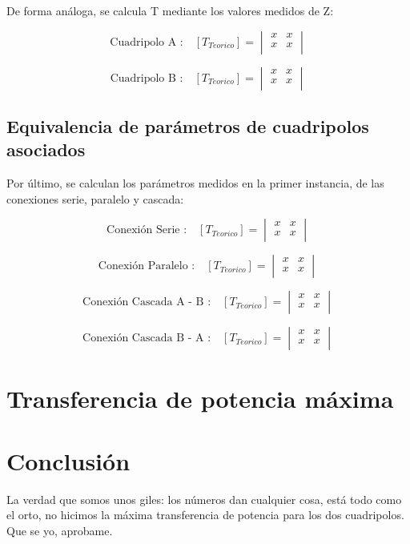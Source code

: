 \documentclass[a4paper]{article}
\begin{document}
De forma análoga, se calcula T mediante los valores medidos de Z: 

\begin{equation}
\text{Cuadripolo A :}\quad [T_{Teorico}] =
\begin{vmatrix}
	x & x\\
	x & x\\
\end{vmatrix}
\end{equation}

\begin{equation}
\text{Cuadripolo B :}\quad [T_{Teorico}] =
\begin{vmatrix}
	x & x\\
	x & x\\
\end{vmatrix}
\end{equation}

\subsection*{Equivalencia de parámetros de cuadripolos asociados}

Por último, se calculan los parámetros medidos en la primer instancia, de las conexiones serie, paralelo y cascada:

\begin{equation}
\text{Conexión Serie :}\quad [T_{Teorico}] =
\begin{vmatrix}
	x & x\\
	x & x\\
\end{vmatrix}
\end{equation}

\begin{equation}
\text{Conexión Paralelo :}\quad [T_{Teorico}] =
\begin{vmatrix}
	x & x\\
	x & x\\
\end{vmatrix}
\end{equation}

\begin{equation}
\text{Conexión Cascada A - B :}\quad [T_{Teorico}] =
\begin{vmatrix}
	x & x\\
	x & x\\
\end{vmatrix}
\end{equation}

\begin{equation}
\text{Conexión Cascada B - A :}\quad [T_{Teorico}] =
\begin{vmatrix}
	x & x\\
	x & x\\
\end{vmatrix}
\end{equation}

\section*{Transferencia de potencia máxima}

\section*{Conclusión}

La verdad que somos unos giles: los números dan cualquier cosa, está todo como el orto, no hicimos la máxima transferencia de potencia para los dos cuadripolos. Que se yo, aprobame.
\end{document}
